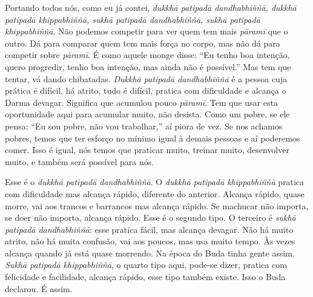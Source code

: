 Portando todos nós, como eu já contei, \textit{dukkhā patipadā
dandhabhiññā, dukkhā patipadā khippabhiññā, sukhā patipadā
dandhabhiññā, sukhā patipadā khippabhiññā}. Não podemos
competir para ver quem tem mais \textit{pāramī} que o outro. Dá
para comparar quem tem mais força no corpo, mas não dá para competir
sobre \textit{pāramī}. É como aquele monge disse: “Eu tenho boa
intenção, quero progredir, tenho boa intenção, mas ainda não é
possível.” Mas tem que tentar, vá dando chibatadas. \textit{Dukkhā
patipadā dandhabhiññā} é a pessoa cuja prática é difícil, há
atrito, tudo é difícil, pratica com dificuldade e alcança o Darma
devagar. Significa que acumulou pouco \textit{pāramī}. Tem que
usar esta oportunidade aqui para acumular muito, não desista. Como um
pobre, se ele pensa: “Eu sou pobre, não vou trabalhar,” aí piora de
vez. Se nos achamos pobres, temos que ter esforço no mínimo igual à
demais pessoas e aí poderemos comer. Isso é igual, nós temos que
praticar muito, treinar muito, desenvolver muito, e também será
possível para nós.

Esse é o \textit{dukkhā patipadā dandhabhiññā}. O
\textit{dukkhā patipadā khippabhiññā} pratica com dificuldade mas
alcança rápido, diferente do anterior. Alcança rápido, quase morre, vai
aos trancos e barrancos mas alcança rápido. Se machucar não importa, se
doer não importa, alcança rápido. Esse é o segundo tipo. O terceiro é
\textit{sukhā patipadā dandhabhiññā}: esse pratica fácil, mas
alcança devagar. Não há muito atrito, não há muita confusão, vai aos
poucos, mas usa muito tempo. Às vezes alcança quando já está quase
morrendo. Na época do Buda tinha gente assim. \textit{Sukhā
patipadā khippabhiññā}, o quarto tipo aqui, pode-se dizer, pratica
com felicidade e facilidade, alcança rápido, esse tipo também existe.
Isso o Buda declarou. É assim.

